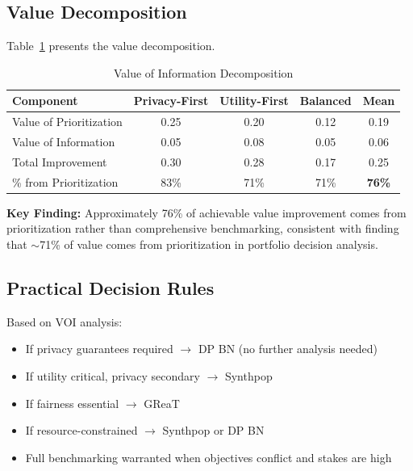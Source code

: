\documentclass[12pt,a4paper]{article}
\begin{document}
\subsection{Value Decomposition}

Table~\ref{tab:voi} presents the value decomposition.

\begin{table}[htbp]
\centering
\caption{Value of Information Decomposition}
\label{tab:voi}
\begin{tabular}{@{}lcccc@{}}
\toprule
\textbf{Component} & \textbf{Privacy-First} & \textbf{Utility-First} & \textbf{Balanced} & \textbf{Mean} \\
\midrule
Value of Prioritization & 0.25 & 0.20 & 0.12 & 0.19 \\
Value of Information & 0.05 & 0.08 & 0.05 & 0.06 \\
Total Improvement & 0.30 & 0.28 & 0.17 & 0.25 \\
\% from Prioritization & 83\% & 71\% & 71\% & \textbf{76\%} \\
\bottomrule
\end{tabular}
\end{table}

\textbf{Key Finding:} Approximately 76\% of achievable value improvement comes from prioritization rather than comprehensive benchmarking, consistent with \citet{keisler2004value} finding that $\sim$71\% of value comes from prioritization in portfolio decision analysis.

\subsection{Practical Decision Rules}

Based on VOI analysis:
\begin{itemize}
    \item If privacy guarantees required $\rightarrow$ DP BN (no further analysis needed)
    \item If utility critical, privacy secondary $\rightarrow$ Synthpop
    \item If fairness essential $\rightarrow$ GReaT
    \item If resource-constrained $\rightarrow$ Synthpop or DP BN
    \item Full benchmarking warranted when objectives conflict and stakes are high
\end{itemize}

\end{document}
